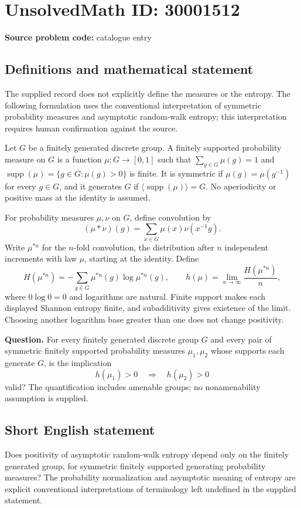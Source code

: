 \documentclass[11pt]{article}
\begin{document}
\section*{UnsolvedMath ID: 30001512}
\textbf{Source problem code:} catalogue entry
\subsection{Definitions and mathematical statement}
The supplied record does not explicitly define the measures or the entropy. The following formulation uses the conventional interpretation of symmetric probability measures and asymptotic random-walk entropy; this interpretation requires human confirmation against the source.

Let \(G\) be a finitely generated discrete group. A finitely supported probability measure on \(G\) is a function \(\mu:G\to[0,1]\) such that \(\sum_{g\in G}\mu(g)=1\) and \(\operatorname{supp}(\mu)=\{g\in G:\mu(g)>0\}\) is finite. It is symmetric if \(\mu(g)=\mu(g^{-1})\) for every \(g\in G\), and it generates \(G\) if \(\langle\operatorname{supp}(\mu)\rangle=G\). No aperiodicity or positive mass at the identity is assumed.

For probability measures \(\mu,\nu\) on \(G\), define convolution by
\[
(\mu*\nu)(g)=\sum_{x\in G}\mu(x)\nu(x^{-1}g).
\]
Write \(\mu^{*n}\) for the \(n\)-fold convolution, the distribution after \(n\) independent increments with law \(\mu\), starting at the identity. Define
\[
H(\mu^{*n})=-\sum_{g\in G}\mu^{*n}(g)\log\mu^{*n}(g),
\qquad
h(\mu)=\lim_{n\to\infty}\frac{H(\mu^{*n})}{n},
\]
where \(0\log0=0\) and logarithms are natural. Finite support makes each displayed Shannon entropy finite, and subadditivity gives existence of the limit. Choosing another logarithm base greater than one does not change positivity.

\textbf{Question.} For every finitely generated discrete group \(G\) and every pair of symmetric finitely supported probability measures \(\mu_1,\mu_2\) whose supports each generate \(G\), is the implication
\[
h(\mu_1)>0\quad\Longrightarrow\quad h(\mu_2)>0
\]
valid? The quantification includes amenable groups; no nonamenability assumption is supplied.
\subsection{Short English statement}
Does positivity of asymptotic random-walk entropy depend only on the finitely generated group, for symmetric finitely supported generating probability measures? The probability normalization and asymptotic meaning of entropy are explicit conventional interpretations of terminology left undefined in the supplied statement.
\end{document}
